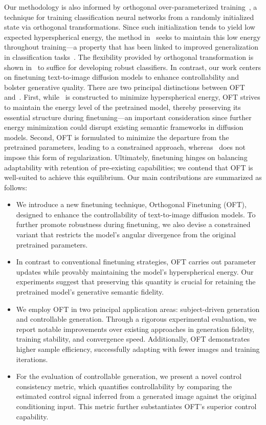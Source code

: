Our methodology is also informed by orthogonal over-parameterized training~\cite{liu2021orthogonal}, a technique for training classification neural networks from a randomly initialized state via orthogonal transformations. Since such initialization tends to yield low expected hyperspherical energy, the method in~\cite{liu2021orthogonal} seeks to maintain this low energy throughout training—a property that has been linked to improved generalization in classification tasks~\cite{liu2018learning,lin2020regularizing}. The flexibility provided by orthogonal transformation is shown in~\cite{liu2021orthogonal} to suffice for developing robust classifiers. In contrast, our work centers on finetuning text-to-image diffusion models to enhance controllability and bolster generative quality. There are two principal distinctions between OFT and~\cite{liu2021orthogonal}. First, while~\cite{liu2021orthogonal} is constructed to minimize hyperspherical energy, OFT strives to maintain the energy level of the pretrained model, thereby preserving its essential structure during finetuning—an important consideration since further energy minimization could disrupt existing semantic frameworks in diffusion models. Second, OFT is formulated to minimize the departure from the pretrained parameters, leading to a constrained approach, whereas~\cite{liu2021orthogonal} does not impose this form of regularization. Ultimately, finetuning hinges on balancing adaptability with retention of pre-existing capabilities; we contend that OFT is well-suited to achieve this equilibrium. Our main contributions are summarized as follows:

\begin{itemize}[leftmargin=*,nosep]

    \item We introduce a new finetuning technique, Orthogonal Finetuning (OFT), designed to enhance the controllability of text-to-image diffusion models. To further promote robustness during finetuning, we also devise a constrained variant that restricts the model’s angular divergence from the original pretrained parameters.
    \item In contrast to conventional finetuning strategies, OFT carries out parameter updates while provably maintaining the model’s hyperspherical energy. Our experiments suggest that preserving this quantity is crucial for retaining the pretrained model’s generative semantic fidelity.
    \item We employ OFT in two principal application areas: subject-driven generation and controllable generation. Through a rigorous experimental evaluation, we report notable improvements over existing approaches in generation fidelity, training stability, and convergence speed. Additionally, OFT demonstrates higher sample efficiency, successfully adapting with fewer images and training iterations.
    \item For the evaluation of controllable generation, we present a novel control consistency metric, which quantifies controllability by comparing the estimated control signal inferred from a generated image against the original conditioning input. This metric further substantiates OFT’s superior control capability.
\end{itemize}

